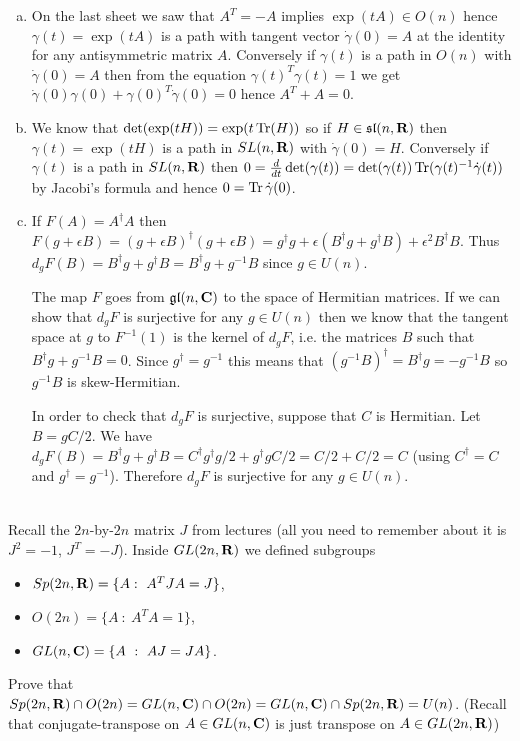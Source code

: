 \documentclass[12pt]{article}
\begin{document}
\begin{answer}
\begin{enumerate}[(a)]
\item On the last sheet we saw that $A^T=-A$ implies $\exp(tA)\in O(n)$ hence $\gamma(t)=\exp(tA)$ is a path with tangent vector $\dot{\gamma}(0)=A$ at the identity for any antisymmetric matrix $A$. Conversely if $\gamma(t)$ is a path in $O(n)$ with $\dot{\gamma}(0)=A$ then from the equation $\gamma(t)^T\gamma(t)=1$ we get $\dot{\gamma}(0)\gamma(0)+\gamma(0)^T\dot{\gamma}(0)=0$ hence $A^T+A=0$.
\item We know that $\det(\exp(tH))=\exp(t\operatorname{Tr}(H))$ so if $H\in\mathfrak{sl}(n,\mathbf{R})$ then $\gamma(t)=\exp(tH)$ is a path in $SL(n,\mathbf{R})$ with $\dot{\gamma}(0)=H$. Conversely if $\gamma(t)$ is a path in $SL(n,\mathbf{R})$ then $0=\frac{d}{dt}\det(\gamma(t))=\det(\gamma(t))\operatorname{Tr}(\gamma(t)^{-1}\dot{\gamma}(t))$ by Jacobi's formula and hence $0=\operatorname{Tr}\dot{\gamma}(0)$.
\item If $F(A)=A^{\dagger}A$ then $F(g+\epsilon B)=(g+\epsilon B)^{\dagger}(g+\epsilon B)=g^{\dagger}g+\epsilon(B^{\dagger}g+g^{\dagger}B)+\epsilon^2B^{\dagger}B$. Thus $d_gF(B)=B^{\dagger}g+g^{\dagger}B=B^{\dagger}g+g^{-1}B$ since $g\in U(n)$.

The map $F$ goes from $\mathfrak{gl}(n,\mathbf{C})$ to the space of Hermitian matrices. If we can show that $d_gF$ is surjective for any $g\in U(n)$ then we know that the tangent space at $g$ to $F^{-1}(1)$ is the kernel of $d_gF$, i.e. the matrices $B$ such that $B^{\dagger}g+g^{-1}B=0$. Since $g^{\dagger}=g^{-1}$ this means that $(g^{-1}B)^{\dagger}=B^{\dagger}g=-g^{-1}B$ so $g^{-1}B$ is skew-Hermitian.

In order to check that $d_gF$ is surjective, suppose that $C$ is Hermitian. Let $B=gC/2$. We have $d_gF(B)=B^{\dagger}g+g^{\dagger}B=C^{\dagger}g^{\dagger}g/2+g^{\dagger}gC/2=C/2+C/2=C$ (using $C^{\dagger}=C$ and $g^{\dagger}=g^{-1}$). Therefore $d_gF$ is surjective for any $g\in U(n)$.
\end{enumerate}
\end{answer}
\newpage


\bigskip

\begin{question}\ \\
Recall the $2n$-by-$2n$ matrix $J$ from lectures (all you need to remember about it is $J^2=-1$, $J^T=-J$). Inside $GL(2n,\mathbf{R})$ we defined subgroups
\begin{itemize}
\item $Sp(2n,\RR)=\{A :\ A^TJA=J\}$,
\item $O(2n)=\{A\ :\ A^TA=1\}$,
\item $GL(n,\CC)=\{A\ :\ AJ=JA\}$.
\end{itemize}
Prove that $Sp(2n,\mathbf{R})\cap O(2n)=GL(n,\mathbf{C})\cap O(2n)=GL(n,\mathbf{C})\cap Sp(2n,\mathbf{R})=U(n)$. (Recall that conjugate-transpose on $A\in GL(n,\mathbf{C})$ is just transpose on $A\in GL(2n,\mathbf{R})$)
\end{question}
\end{document}
